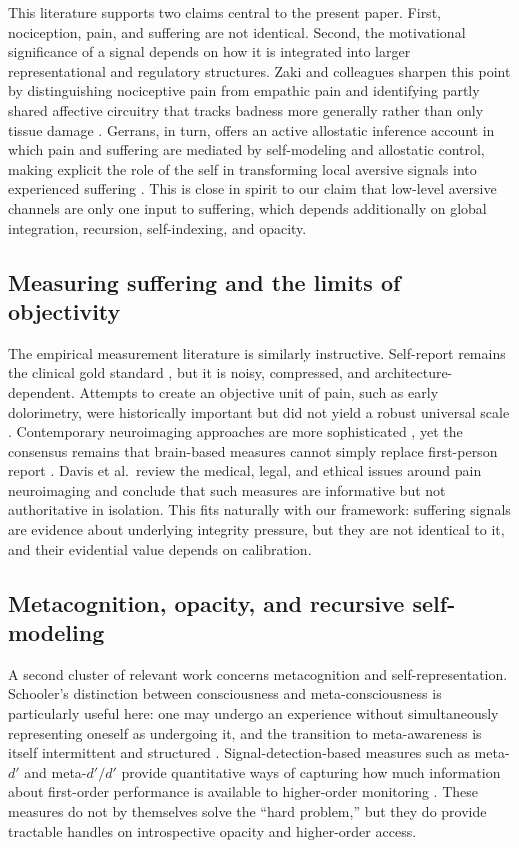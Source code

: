 \documentclass[11pt]{article}
\begin{document}
This literature supports two claims central to the present paper. First, nociception, pain, and suffering are not identical. Second, the motivational significance of a signal depends on how it is integrated into larger representational and regulatory structures. Zaki and colleagues sharpen this point by distinguishing nociceptive pain from empathic pain and identifying partly shared affective circuitry that tracks badness more generally rather than only tissue damage \cite{zaki2016anatomy}. Gerrans, in turn, offers an active allostatic inference account in which pain and suffering are mediated by self-modeling and allostatic control, making explicit the role of the self in transforming local aversive signals into experienced suffering \cite{gerrans2024pain}. This is close in spirit to our claim that low-level aversive channels are only one input to suffering, which depends additionally on global integration, recursion, self-indexing, and opacity.

\subsection{Measuring suffering and the limits of objectivity}

The empirical measurement literature is similarly instructive. Self-report remains the clinical gold standard \cite{iasp2020pain}, but it is noisy, compressed, and architecture-dependent. Attempts to create an objective unit of pain, such as early dolorimetry, were historically important but did not yield a robust universal scale \cite{hardy1948dol,wall1999pain}. Contemporary neuroimaging approaches are more sophisticated \cite{wager2013fmripain}, yet the consensus remains that brain-based measures cannot simply replace first-person report \cite{thacker2012firstperson,davis2017brainimaging}. Davis et al.\ review the medical, legal, and ethical issues around pain neuroimaging and conclude that such measures are informative but not authoritative in isolation. This fits naturally with our framework: suffering signals are evidence about underlying integrity pressure, but they are not identical to it, and their evidential value depends on calibration.

\subsection{Metacognition, opacity, and recursive self-modeling}

A second cluster of relevant work concerns metacognition and self-representation. Schooler’s distinction between consciousness and meta-consciousness is particularly useful here: one may undergo an experience without simultaneously representing oneself as undergoing it, and the transition to meta-awareness is itself intermittent and structured \cite{schooler2002rerepresenting}. Signal-detection-based measures such as meta-$d'$ and meta-$d'/d'$ provide quantitative ways of capturing how much information about first-order performance is available to higher-order monitoring \cite{maniscalco2012metad,fleming2014measure}. These measures do not by themselves solve the “hard problem,” but they do provide tractable handles on introspective opacity and higher-order access.
\end{document}
